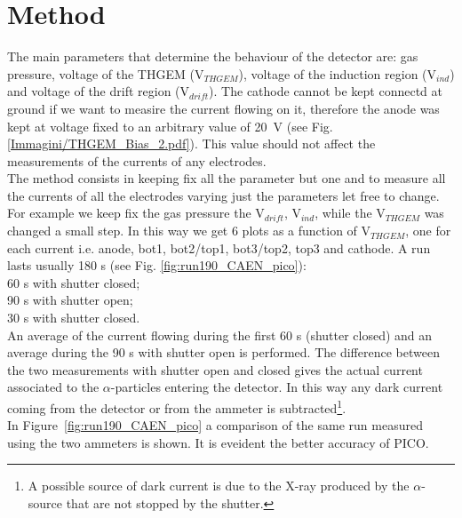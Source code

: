 \documentclass[a4paper, 11 pt]{report}
\begin{document}
\section{Method}

The main parameters that determine the behaviour of the detector are: gas pressure, voltage of the 
THGEM (V$_{THGEM}$), voltage of the induction region (V$_{ind}$) and voltage of the drift region 
(V$_{drift}$).
The cathode cannot be kept connectd at ground if we want to measire the current flowing on it,
therefore the anode was kept at voltage fixed to an arbitrary value of 20~V (see Fig. 
\ref{Immagini/THGEM_Bias_2.pdf}). This value should not affect the measurements of the currents of 
any electrodes.\\

The method consists in keeping fix all the parameter but one and to measure all the currents of 
all the electrodes varying just the parameters let free to change. For example we keep fix the gas 
pressure the V$_{drift}$, V$_{ind}$, while the V$_{THGEM}$ was changed a small step. In this way 
we get 6 plots as a function of V$_{THGEM}$, one for each current i.e. anode, bot1, bot2/top1, 
bot3/top2, top3 and cathode.
A run lasts usually 180 s (see Fig. \ref{fig:run190_CAEN_pico}):\\
60 s with shutter closed;\\
90 s with shutter open;\\
30 s with shutter closed.\\
An average of the current flowing during the first 60 s (shutter closed) and an average during
the 90 s with shutter open is performed. The difference between the two measurements with shutter 
open and closed gives the actual current associated to the $\alpha$-particles entering the 
detector. In this way any dark current coming from the detector or from the ammeter is 
subtracted\footnote{A possible source of dark current is due to the X-ray produced by the 
$\alpha$-source that are not stopped by the shutter.}.\\

In Figure~\ref{fig:run190_CAEN_pico} a comparison of the same run measured using the two 
ammeters is shown. It is eveident the better accuracy of PICO.

\clearpage
\end{document}
